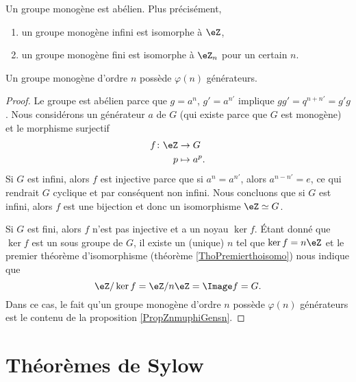 \begin{theorem}
    Un groupe monogène est abélien. Plus précisément,
    \begin{enumerate}
        \item
            un groupe monogène infini est isomorphe à \( \eZ\),
        \item
            un groupe monogène fini est isomorphe à \( \eZ_n\) pour un certain \( n\).
    \end{enumerate}
    Un groupe monogène d'ordre \( n\) possède \( \varphi(n)\) générateurs.
\end{theorem}

\begin{proof}
    Le groupe est abélien parce que $g=a^n$, \( g'=a^{n'}\) implique \( gg'=q^{n+n'}=g'g\). Nous considérons un générateur \( a\) de \( G\) (qui existe parce que $G$ est monogène) et le morphisme surjectif
    \begin{equation}
        \begin{aligned}
            f\colon \eZ&\to G \\
            p&\mapsto a^p. 
        \end{aligned}
    \end{equation}
    Si \( G\) est infini, alors \( f\) est injective parce que si \( a^n=a^{n'}\), alors \( a^{n-n'}=e\), ce qui rendrait \( G\) cyclique et par conséquent non infini. Nous concluons que si \( G\) est infini, alors \( f\) est une bijection et donc un isomorphisme \( \eZ\simeq G\).

    Si \( G\) est fini, alors \( f\) n'est pas injective et a un noyau \( \ker f\). Étant donné que \( \ker f\) est un sous groupe de \( G\), il existe un (unique) \( n\) tel que \( \ker f=n\eZ\) et le premier théorème d'isomorphisme (théorème \ref{ThoPremierthoisomo}) nous indique que
    \begin{equation}
        \eZ/\ker f=\eZ/n\eZ=\Image f=G.
    \end{equation}
    Dans ce cas, le fait qu'un groupe monogène d'ordre \( n\) possède \( \varphi(n)\) générateurs est le contenu de la proposition \ref{PropZnmuphiGensn}.
\end{proof}

\section{Théorèmes de Sylow}

